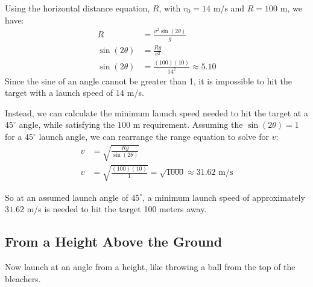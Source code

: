 \begin{Answer}[ref=projectiles_angle3]

Using the horizontal distance equation, $R$, with $v_0 = 14$ m/s and $R = 100$ m, we have:
\begin{align*}
R&=\frac{v^2\sin(2\theta)}{g} \\ 
\sin(2\theta) &= \frac{Rg}{v^2} \\
\sin(2\theta) &= \frac{(100)(10)}{14^2} \approx 5.10
\end{align*}
Since the sine of an angle cannot be greater than 1, it is impossible to hit the target with a launch speed of 14 m/s.

Instead, we can calculate the minimum launch speed needed to hit the target at a $45^\circ$ angle, while satisfying the $100$ m requirement. Assuming the $\sin(2\theta) = 1$ for a $45^\circ$ launch angle, we can rearrange the range equation to solve for $v$:
\begin{align*}
v &= \sqrt{\frac{Rg}{\sin(2\theta)}} \\
v &= \sqrt{\frac{(100)(10)}{1}} = \sqrt{1000} \approx 31.62 \text{ m/s}
\end{align*}

So at an assumed launch angle of $45^\circ$, a minimum launch speed of approximately $31.62$ m/s is needed to hit the target 100 meters away.
\end{Answer}




\subsection{From a Height Above the Ground}
Now launch at an angle from a height, like throwing a ball from the top of
the bleachers.

